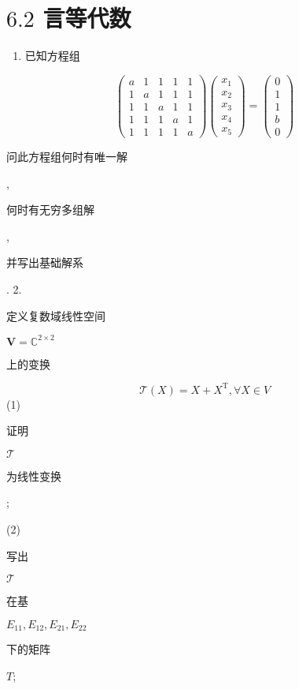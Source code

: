 \documentclass[10pt]{article}
\begin{document}
\section{$6.2$ 言等代数}
\begin{enumerate}
  \item \begin{CJK}{UTF8}{mj}已知方程组\end{CJK}
\end{enumerate}
$$
\left(\begin{array}{lllll}
a & 1 & 1 & 1 & 1 \\
1 & a & 1 & 1 & 1 \\
1 & 1 & a & 1 & 1 \\
1 & 1 & 1 & a & 1 \\
1 & 1 & 1 & 1 & a
\end{array}\right)\left(\begin{array}{l}
x_{1} \\
x_{2} \\
x_{3} \\
x_{4} \\
x_{5}
\end{array}\right)=\left(\begin{array}{l}
0 \\
1 \\
1 \\
b \\
0
\end{array}\right)
$$
\begin{CJK}{UTF8}{mj}问此方程组何时有唯一解\end{CJK}, \begin{CJK}{UTF8}{mj}何时有无穷多组解\end{CJK}, \begin{CJK}{UTF8}{mj}并写出基础解系\end{CJK}. 2. \begin{CJK}{UTF8}{mj}定义复数域线性空间\end{CJK} $\boldsymbol{V}=\mathbb{C}^{2 \times 2}$ \begin{CJK}{UTF8}{mj}上的变换\end{CJK}
$$
\mathscr{T}(X)=X+X^{\mathrm{T}}, \forall X \in V
$$
(1) \begin{CJK}{UTF8}{mj}证明\end{CJK} $\mathscr{T}$ \begin{CJK}{UTF8}{mj}为线性变换\end{CJK};

(2) \begin{CJK}{UTF8}{mj}写出\end{CJK} $\mathscr{T}$ \begin{CJK}{UTF8}{mj}在基\end{CJK} $E_{11}, E_{12}, E_{21}, E_{22}$ \begin{CJK}{UTF8}{mj}下的矩阵\end{CJK} $T$;
\end{document}
